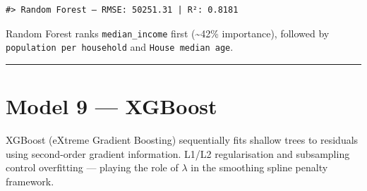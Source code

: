 \documentclass[
]{article}
\newenvironment{Shaded}{\begin{snugshade}}{\end{snugshade}}
\newcommand{\AttributeTok}[1]{\textcolor[rgb]{0.13,0.29,0.53}{#1}}
\newcommand{\FunctionTok}[1]{\textcolor[rgb]{0.13,0.29,0.53}{\textbf{#1}}}
\newcommand{\NormalTok}[1]{#1}
\newcommand{\OtherTok}[1]{\textcolor[rgb]{0.56,0.35,0.01}{#1}}
\newcommand{\SpecialCharTok}[1]{\textcolor[rgb]{0.81,0.36,0.00}{\textbf{#1}}}
\newcommand{\StringTok}[1]{\textcolor[rgb]{0.31,0.60,0.02}{#1}}
\begin{document}
\begin{Shaded}
\end{Shaded}

\begin{verbatim}
#> Random Forest — RMSE: 50251.31 | R²: 0.8181
\end{verbatim}

Random Forest ranks \texttt{median\_income} first (\textasciitilde42\%
importance), followed by \texttt{population\ per\ household} and
\texttt{House\ median\ age}.

\begin{center}\rule{0.5\linewidth}{0.5pt}\end{center}

\section{Model 9 --- XGBoost}\label{xgboost}

XGBoost (eXtreme Gradient Boosting) sequentially fits shallow trees to
residuals using second-order gradient information. L1/L2 regularisation
and subsampling control overfitting --- playing the role of \(\lambda\)
in the smoothing spline penalty framework.
\end{document}
